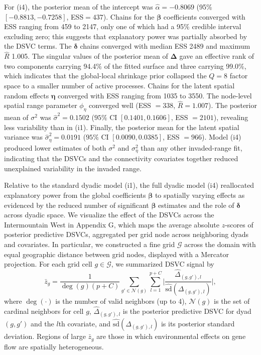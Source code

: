 \documentclass{article}
\begin{document}
For (i4), the posterior mean of the intercept was $\hat{\alpha}=-0.8069$ (95\% $[-0.8813,-0.7258]$, ESS$=437$).
Chains for the $\boldsymbol\beta$ coefficients converged with ESS ranging from 459 to 2147, only one of which had a 95\% credible interval excluding zero; this suggests that explanatory power was partially absorbed by the DSVC terms. The $\boldsymbol{\delta}$ chains converged with median ESS 2489 and maximum $\widehat{R}$ 1.005. 
The singular values of the posterior mean of $\boldsymbol{\Delta}$ gave an effective rank of two components carrying 94.4\% of the fitted surface and three carrying 99.0\%, which indicates that the global-local shrinkage prior collapsed the $Q=8$ factor space to a smaller number of active processes.
Chains for the latent spatial random effects $\boldsymbol{\eta}$ converged with ESS ranging from 1035 to 3550. 
The node-level spatial range parameter $\phi_\eta$ converged well (ESS $=338$, $\hat{R}=1.007$). The posterior mean of $\sigma^2$ was $\hat\sigma^2=0.1502$ ($95\%$ CI $[0.1401,0.1606]$, ESS $=2101$), revealing less variability than in (i1). Finally, the posterior mean for the latent spatial variance was $\hat\sigma^2_\eta=0.0191$ ($95\%$ CI $[0.0090,0.0385]$, ESS $=966$). Model (i4) produced lower estimates of both $\sigma^2$ and $\sigma^2_\eta$ than any other invaded-range fit, indicating that the DSVCs and the connectivity covariates together reduced unexplained variability in the invaded range. 

Relative to the standard dyadic model (i1), the full dyadic model (i4) reallocated explanatory power from the global coefficients $\boldsymbol\beta$ to spatially varying effects as evidenced by the reduced number of significant $\boldsymbol{\beta}$ estimates and the role of $\boldsymbol{\delta}$ across dyadic space. 
We visualize the effect of the DSVCs across the Intermountain West in Appendix G, which maps the average absolute $z$-scores of posterior predictive DSVCs, aggregated per grid node across neighboring dyads and covariates. In particular, we constructed a fine grid $\mathcal{G}$ across the domain with equal geographic distance between grid nodes, displayed with a Mercator projection. For each grid cell $g\in\mathcal{G}$, we summarized DSVC signal by 
$$\bar{z}_g=\frac{1}{\deg(g)(p+C)}\sum_{g'\in\mathcal{N}(g)}\sum^{p+C}_{l=1}\bigg|\frac{\widehat{\Delta}_{(g,g'),l}}{\widehat{\text{sd}}(\Delta_{(g,g'),l})}\bigg|,$$ 
where $\deg(\cdot)$ is the number of valid neighbors (up to 4), $\mathcal{N}(g)$ is the set of cardinal neighbors for cell $g$, $\widehat{\Delta}_{(g,g'),l}$ is the posterior predictive DSVC for dyad $(g,g')$ and the $l$th covariate, and $\widehat{\text{sd}}(\Delta_{(g,g'),l})$ is its posterior standard deviation. Regions of large $\bar{z}_g$ are those in which environmental effects on gene flow are spatially heterogeneous.
\end{document}
